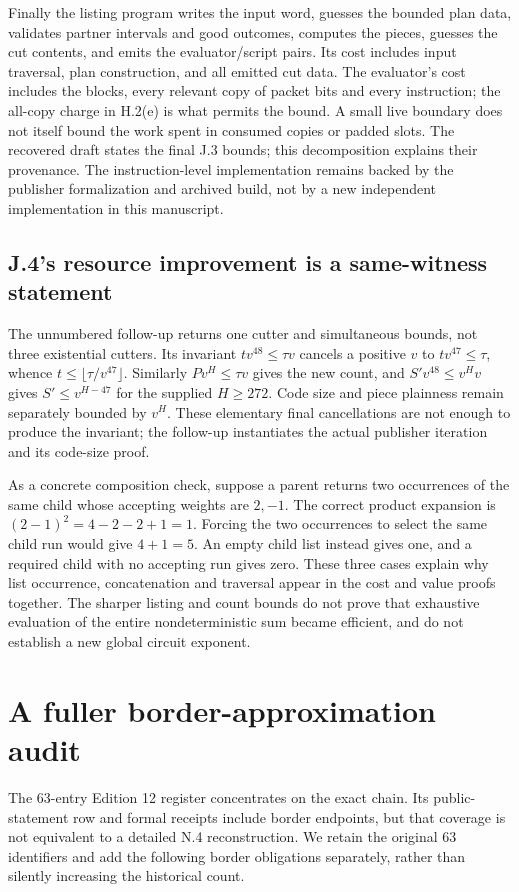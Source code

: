 \documentclass[11pt,letterpaper]{article}
\theoremstyle{definition}\newtheorem{definition}[theorem]{Definition}\newtheorem{example}[theorem]{Example}
\theoremstyle{remark}\newtheorem{remark}[theorem]{Remark}
\begin{document}
Finally the listing program writes the input word, guesses the bounded plan data, validates partner intervals and good outcomes, computes the pieces, guesses the cut contents, and emits the evaluator/script pairs. Its cost includes input traversal, plan construction, and all emitted cut data. The evaluator's cost includes the blocks, every relevant copy of packet bits and every instruction; the all-copy charge in H.2(e) is what permits the bound. A small live boundary does not itself bound the work spent in consumed copies or padded slots. The recovered draft states the final J.3 bounds; this decomposition explains their provenance. The instruction-level implementation remains backed by the publisher formalization and archived build, not by a new independent implementation in this manuscript.

\subsection{J.4's resource improvement is a same-witness statement}
The unnumbered follow-up returns one cutter and simultaneous bounds, not three existential cutters. Its invariant $tv^{48}\le\tau v$ cancels a positive $v$ to $tv^{47}\le\tau$, whence $t\le\lfloor\tau/v^{47}\rfloor$. Similarly $Pv^H\le\tau v$ gives the new count, and $S'v^{48}\le v^Hv$ gives $S'\le v^{H-47}$ for the supplied $H\ge272$. Code size and piece plainness remain separately bounded by $v^H$. These elementary final cancellations are not enough to produce the invariant; the follow-up instantiates the actual publisher iteration and its code-size proof.

As a concrete composition check, suppose a parent returns two occurrences of the same child whose accepting weights are $2,-1$. The correct product expansion is $(2-1)^2=4-2-2+1=1$. Forcing the two occurrences to select the same child run would give $4+1=5$. An empty child list instead gives one, and a required child with no accepting run gives zero. These three cases explain why list occurrence, concatenation and traversal appear in the cost and value proofs together. The sharper listing and count bounds do not prove that exhaustive evaluation of the entire nondeterministic sum became efficient, and do not establish a new global circuit exponent.

\section{A fuller border-approximation audit}\label{sec:borderdetail}
The 63-entry Edition 12 register concentrates on the exact chain. Its public-statement row and formal receipts include border endpoints, but that coverage is not equivalent to a detailed N.4 reconstruction. We retain the original 63 identifiers and add the following border obligations separately, rather than silently increasing the historical count.
\end{document}
